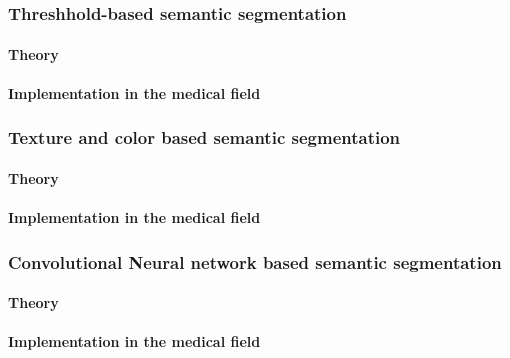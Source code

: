 \chapter{}
\label{sec:state_of_the_art}
\subsection{Threshhold-based semantic segmentation}
\subsubsection{Theory}
\subsubsection{Implementation in the medical field}

\subsection{Texture and color based semantic segmentation}
\subsubsection{Theory}
\subsubsection{Implementation in the medical field}

\subsection{Convolutional Neural network based semantic segmentation}
\subsubsection{Theory}
\subsubsection{Implementation in the medical field}


